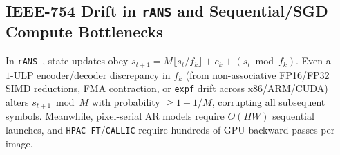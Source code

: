 \subsection{IEEE-754 Drift in \texttt{rANS} and Sequential/SGD Compute Bottlenecks}
In \texttt{rANS}~\citep{duda2013rans}, state updates obey $s_{t+1} = M\lfloor s_t/f_k\rfloor + c_k + (s_t \bmod f_k)$. Even a $1\text{-ULP}$ encoder/decoder discrepancy in $f_k$ (from non-associative FP16/FP32 SIMD reductions, FMA contraction, or \texttt{expf} drift across x86/ARM/CUDA) alters $s_{t+1} \bmod M$ with probability $\ge 1 - 1/M$, corrupting all subsequent symbols. Meanwhile, pixel-serial AR models require $O(HW)$ sequential launches, and \texttt{HPAC-FT}/\texttt{CALLIC} require hundreds of GPU backward passes per image.
